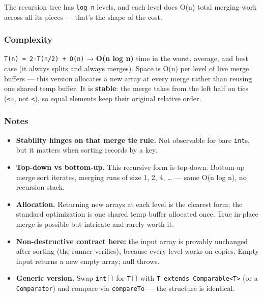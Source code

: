 \documentclass[
  10pt,
  letterpaper,
  onecolumn]{article}
\providecommand{\tightlist}{%
  \setlength{\itemsep}{0pt}\setlength{\parskip}{0pt}}
\begin{document}
The recursion tree has \texttt{log\ n} levels, and each level does O(n)
total merging work across all its pieces --- that's the shape of the
cost.

\hypertarget{complexity-4}{%
\subsubsection{Complexity}\label{complexity-4}}

\texttt{T(n)\ =\ 2·T(n/2)\ +\ O(n)} → \textbf{O(n log n)} time in the
worst, average, and best case (it always splits and always merges).
Space is O(n) per level of live merge buffers --- this version allocates
a new array at every merge rather than reusing one shared temp buffer.
It is \textbf{stable}: the merge takes from the left half on ties
(\texttt{\textless{}=}, not \texttt{\textless{}}), so equal elements
keep their original relative order.

\hypertarget{notes-3}{%
\subsubsection{Notes}\label{notes-3}}

\begin{itemize}
\tightlist
\item
  \textbf{Stability hinges on that merge tie rule.} Not observable for
  bare \texttt{int}s, but it matters when sorting records by a key.
\item
  \textbf{Top-down vs bottom-up.} This recursive form is top-down.
  Bottom-up merge sort iterates, merging runs of size 1, 2, 4, \ldots{}
  --- same O(n log n), no recursion stack.
\item
  \textbf{Allocation.} Returning new arrays at each level is the
  clearest form; the standard optimization is one shared temp buffer
  allocated once. True in-place merge is possible but intricate and
  rarely worth it.
\item
  \textbf{Non-destructive contract here:} the input array is provably
  unchanged after sorting (the runner verifies), because every level
  works on copies. Empty input returns a new empty array; null throws.
\item
  \textbf{Generic version.} Swap \texttt{int{[}{]}} for \texttt{T{[}{]}}
  with \texttt{T\ extends\ Comparable\textless{}T\textgreater{}} (or a
  \texttt{Comparator}) and compare via \texttt{compareTo} --- the
  structure is identical.
\end{itemize}
\end{document}
